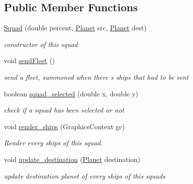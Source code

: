 \subsection*{Public Member Functions}
\begin{DoxyCompactItemize}
\item 
\hyperlink{classfr_1_1groupe40_1_1projet_1_1model_1_1ships_1_1_squad_abf5b8c63d624452536a1fbde111c6424}{Squad} (double percent, \hyperlink{classfr_1_1groupe40_1_1projet_1_1model_1_1planets_1_1_planet}{Planet} src, \hyperlink{classfr_1_1groupe40_1_1projet_1_1model_1_1planets_1_1_planet}{Planet} dest)
\begin{DoxyCompactList}\small\item\em constructor of this squad \end{DoxyCompactList}\item 
\mbox{\label{classfr_1_1groupe40_1_1projet_1_1model_1_1ships_1_1_squad_a3f0632de419eece4428900cd090d5ed7}} 
void \hyperlink{classfr_1_1groupe40_1_1projet_1_1model_1_1ships_1_1_squad_a3f0632de419eece4428900cd090d5ed7}{send\+Fleet} ()
\begin{DoxyCompactList}\small\item\em send a fleet, summoned when there s ships that had to be sent \end{DoxyCompactList}\item 
boolean \hyperlink{classfr_1_1groupe40_1_1projet_1_1model_1_1ships_1_1_squad_a16258df054fffdf1acb534665f4d14f4}{squad\+\_\+selected} (double x, double y)
\begin{DoxyCompactList}\small\item\em check if a squad has been selected or not \end{DoxyCompactList}\item 
void \hyperlink{classfr_1_1groupe40_1_1projet_1_1model_1_1ships_1_1_squad_ae4a39cb93983806cdb45e1edee771ecb}{render\+\_\+ships} (Graphics\+Context gc)
\begin{DoxyCompactList}\small\item\em Render every ships of this squad. \end{DoxyCompactList}\item 
void \hyperlink{classfr_1_1groupe40_1_1projet_1_1model_1_1ships_1_1_squad_a3aa04cec78a61156de500c0ffe244745}{update\+\_\+destination} (\hyperlink{classfr_1_1groupe40_1_1projet_1_1model_1_1planets_1_1_planet}{Planet} destination)
\begin{DoxyCompactList}\small\item\em update destination planet of every ships of this squads \end{DoxyCompactList}\item 

\end{DoxyCompactItemize}
